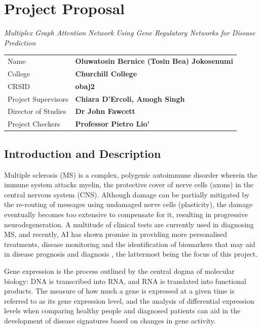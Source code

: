 \documentclass[12pt,a4paper]{report}
\begin{document}
\chapter{Project Proposal}
\begin{center}
    \Large
    \textit{ Multiplex Graph Attention Network Using Gene Regulatory Networks for Disease Prediction} \\
\end{center}
\vspace{2em}
\begin{tabular}{@{}l@{ : }l}
Name & \bf Oluwatosin Bernice (Tosin Bea) Jokosenumi\\
College & \bf Churchill College \\ 
CRSID & \bf obaj2 \\
Project Supervisors & \bf Chiara D'Ercoli, Amogh Singh \\
Director of Studies & \bf Dr John Fawcett \\ 
Project Checkers & \bf Professor Pietro Lio' \\
\end{tabular}
\section{Introduction and Description}

Multiple sclerosis (MS) is a complex, polygenic autoimmune disorder wherein the immune system attacks myelin, the protective cover of nerve cells (axons) in the central nervous system (CNS)\parencite{boutitah-benyaichMultipleSclerosisMolecular2025}. Although damage can be partially  mitigated by the re-routing of messages using undamaged nerve cells (plasticity), the damage eventually becomes too extensive to compensate for it, resulting in progressive neurodegeneration. A multitude of clinical tests are currently used in diagnosing MS, and
recently, AI has shown promise in providing more personalised treatments, disease monitoring and
the identification of biomarkers that may aid in disease prognosis and diagnosis \parencite{aminArtificialIntelligenceMultiple2024}, the lattermost
being the focus of this project.

Gene expression is the process outlined by the central dogma of molecular biology: DNA is transcribed
into RNA, and RNA is translated into functional products. The measure of how much a
gene is expressed at a given time is referred to as its gene expression level, and the analysis of
differential expression levels when comparing healthy people and diagnosed patients can aid in the
development of disease signatures based on changes in gene activity.
\end{document}
